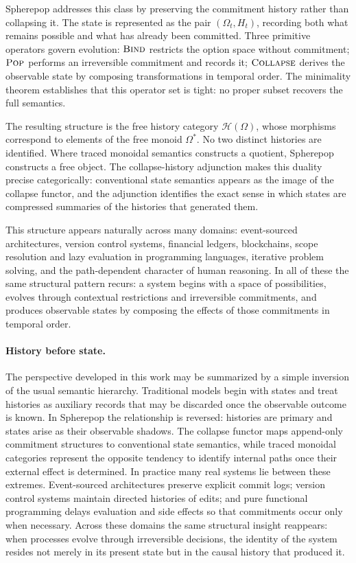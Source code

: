 \documentclass[12pt]{article}
\newcommand{\Pop}{\operatorname{\textsc{Pop}}}
\newcommand{\Bind}{\operatorname{\textsc{Bind}}}
\newcommand{\Collapse}{\operatorname{\textsc{Collapse}}}
\newcommand{\History}{\mathcal{H}}
\newcommand{\Option}{\Omega}
\begin{document}
Spherepop addresses this class by preserving the commitment history rather than collapsing it. The state is represented as the pair $(\Option_t, H_t)$, recording both what remains possible and what has already been committed. Three primitive operators govern evolution: $\Bind$ restricts the option space without commitment; $\Pop$ performs an irreversible commitment and records it; $\Collapse$ derives the observable state by composing transformations in temporal order. The minimality theorem establishes that this operator set is tight: no proper subset recovers the full semantics.

The resulting structure is the free history category $\History(\Option)$, whose morphisms correspond to elements of the free monoid $\Option^*$. No two distinct histories are identified. Where traced monoidal semantics constructs a quotient, Spherepop constructs a free object. The collapse-history adjunction makes this duality precise categorically: conventional state semantics appears as the image of the collapse functor, and the adjunction identifies the exact sense in which states are compressed summaries of the histories that generated them.

This structure appears naturally across many domains: event-sourced architectures, version control systems, financial ledgers, blockchains, scope resolution and lazy evaluation in programming languages, iterative problem solving, and the path-dependent character of human reasoning. In all of these the same structural pattern recurs: a system begins with a space of possibilities, evolves through contextual restrictions and irreversible commitments, and produces observable states by composing the effects of those commitments in temporal order.

\paragraph{History before state.}
The perspective developed in this work may be summarized by a simple inversion of the usual semantic hierarchy. Traditional models begin with states and treat histories as auxiliary records that may be discarded once the observable outcome is known. In Spherepop the relationship is reversed: histories are primary and states arise as their observable shadows. The collapse functor maps append-only commitment structures to conventional state semantics, while traced monoidal categories represent the opposite tendency to identify internal paths once their external effect is determined. In practice many real systems lie between these extremes. Event-sourced architectures preserve explicit commit logs; version control systems maintain directed histories of edits; and pure functional programming delays evaluation and side effects so that commitments occur only when necessary. Across these domains the same structural insight reappears: when processes evolve through irreversible decisions, the identity of the system resides not merely in its present state but in the causal history that produced it.
\end{document}
